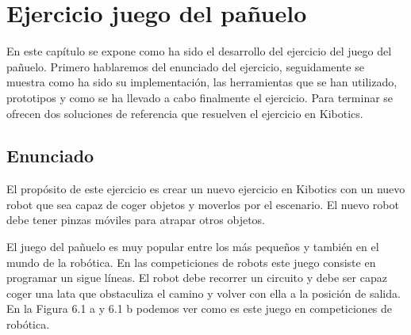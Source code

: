 \chapter{Ejercicio juego del pañuelo} \label{gripper}
En este capítulo se expone como ha sido el desarrollo del ejercicio del juego del pañuelo. Primero hablaremos del enunciado del ejercicio, seguidamente se muestra como ha sido su implementación, las herramientas que se han utilizado, prototipos y como se ha llevado a cabo finalmente el ejercicio. Para terminar se ofrecen dos soluciones de referencia que resuelven el ejercicio en Kibotics.

\section{Enunciado}
El propósito de este ejercicio es crear un nuevo ejercicio en Kibotics con un nuevo robot que sea capaz de coger objetos y moverlos por el escenario. El nuevo robot debe tener pinzas móviles para atrapar otros objetos. 

El juego del pañuelo es muy popular entre los más pequeños y también en el mundo de la robótica. En las competiciones de robots este juego consiste en programar un sigue líneas. El robot debe recorrer un circuito y debe ser capaz coger una lata que obstaculiza el camino  y volver con ella a la posición de salida. En la Figura 6.1 a y 6.1 b podemos ver como es este juego en competiciones de robótica.

